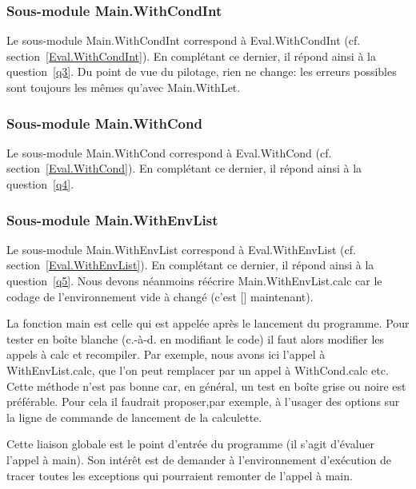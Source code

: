 \documentclass[a4paper,11pt]{article}
\begin{document}
\subsubsection{Sous-module \textsf{Main.WithCondInt}}
\label{Main.WithCondInt}

Le sous-module \textsf{Main.WithCondInt} correspond à
\textsf{Eval.WithCondInt} (cf. section~\ref{Eval.WithCondInt}). En
complétant ce dernier, il répond ainsi à la question~\ref{q3}. Du
point de vue du pilotage, rien ne change: les erreurs possibles sont
toujours les mêmes qu'avec \textsf{Main.WithLet}.

\subsubsection{Sous-module \textsf{Main.WithCond}}\label{Main.WithCond}

Le sous-module \textsf{Main.WithCond} correspond à
\textsf{Eval.WithCond} (cf. section~\ref{Eval.WithCond}). En
complétant ce dernier, il répond ainsi à la question~\ref{q4}.

\subsubsection{Sous-module \textsf{Main.WithEnvList}}
\label{Main.WithEnvList}

Le sous-module \textsf{Main.WithEnvList} correspond à
\textsf{Eval.WithEnvList} (cf. section~\ref{Eval.WithEnvList}). En
complétant ce dernier, il répond ainsi à la question~\ref{q5}. Nous
devons néanmoins réécrire \textsf{Main.WithEnvList.calc} car le codage
de l'environ\-ne\-ment vide à changé (c'est \textsf{[\;]} maintenant).

La fonction \textsf{main} est celle qui est appelée après le lancement
du programme. Pour tester en boîte blanche (c.-à-d. en modifiant le
code) il faut alors modifier les appels à \textsf{calc} et
recompiler. Par exemple, nous avons ici l'appel à
\textsf{WithEnvList.calc}, que l'on peut remplacer par un appel à
\textsf{WithCond.calc} etc. Cette méthode n'est pas bonne car, en
général, un test en boîte grise ou noire est préférable. Pour cela il
faudrait proposer,par exemple, à l'usager des options sur la ligne de
commande de lancement de la calculette.

Cette liaison globale est le point d'entrée du programme (il s'agit
d'évaluer l'appel à \textsf{main}). Son intérêt est de demander à
l'environnement d'exécution de tracer toutes les exceptions qui
pourraient remonter de l'appel à \textsf{main}.
\end{document}
